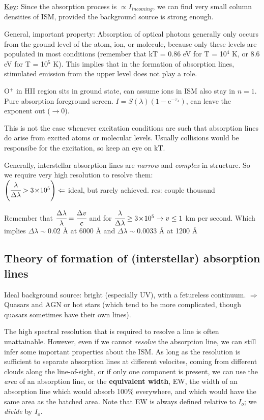 \documentclass[12pt]{article}
\newcommand{\mar}[1]{\hspace{0pt}\marginpar{-\textcolor{black}{#1}-}}
\newcommand{\mynotes}[1]{\textcolor{mygreen}{#1}}
\begin{document}
\underline{Key}: Since the absorption process is $\propto I_{incoming}$,
we can find very small column densities of ISM, provided the
background source is strong enough.

General, important property: Absorption of optical photons generally
only occurs from the ground level of the atom, ion, or molecule,
because only these levels are populated in most conditions
(remember that kT = 0.86 eV for T = 10$^{4}$ K, or 8.6 eV for T = 10$^{5}$ K).
This implies that in the formation of absorption lines, stimulated emission
from the upper level does not play a role.

\mynotes{O$^{+}$ in HII region sits in ground state, can assume ions
in ISM also stay in $n=1$. Pure absorption foreground screen.
$I = S(\lambda)\left(1-\mathrm{e}^{-\tau_{\lambda}}\right)$, can
leave the exponent out ($\rightarrow 0$).}

This is not the case whenever excitation conditions are such that
absorption lines do arise from excited atoms or molecular levels.
Usually collisions would be responsibe for the excitation, so keep
an eye on kT.

\mar{90}Generally, interstellar absorption lines are \emph{narrow} and
\emph{complex} in structure. So we require very high resolution to
resolve them:\\
$\left(\cfrac{\lambda}{\Delta\lambda} > 3\!\times\!10^{5}\right) \Leftarrow$
ideal, but rarely achieved. \mynotes{res: couple thousand}

\begin{framed}%
Remember that $\cfrac{\Delta\lambda}{\lambda} = \cfrac{\Delta{v}}{c}$
and for $\cfrac{\lambda}{\Delta\lambda} \ge 3\!\times\!10^{5}
\rightarrow v \le 1$ km per second. Which implies
$\Delta\lambda \sim 0.02$ \AA{} at 6000 \AA{} and
$\Delta\lambda \sim 0.0033$ \AA{} at 1200 \AA{}
\end{framed}

\subsection{Theory of formation of (interstellar) absorption lines}
\mynotes{Ideal background source: bright (especially UV), with a
fetureless continuum. $\Rightarrow$ Quasars and AGN or hot stars
(which tend to be more complicated, though quasars sometimes have
their own lines).}

The high spectral resolution that is required to resolve a line is
often unattainable. However, even if we cannot \emph{resolve} the
absorption line, we can still infer some important properties about
the ISM. As long as the resolution is sufficient to separate absorption lines
at different velocites, coming from different clouds along the
line-of-sight, or if only one component is present, we can use the
\emph{area} of an absorption line, or the \textbf{equivalent width}, EW,
the width of an absorption line which would absorb 100\% everywhere, and
which would have the same area as the hatched area. Note that EW
is always defined relative to $I_{o}$; we \emph{divide} by $I_{o}$.
\end{document}
